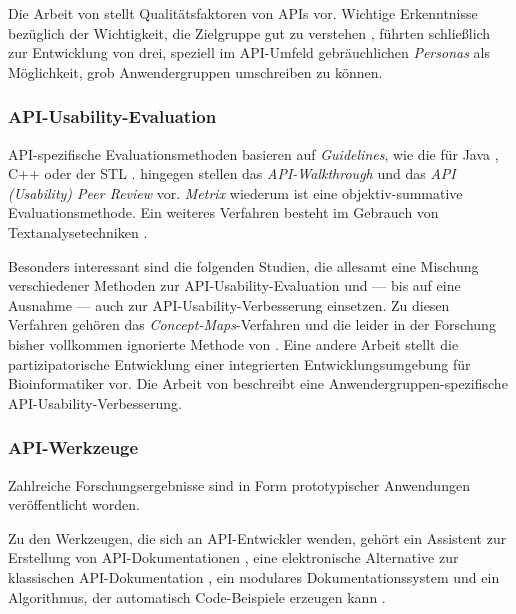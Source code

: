 Die Arbeit von \cite{Stylos:2007ip} stellt Qualitätsfaktoren von APIs vor. Wichtige Erkenntnisse bezüglich der Wichtigkeit, die Zielgruppe gut zu verstehen \citep{Nykaza:2002im}, führten schließlich zur Entwicklung von drei, speziell im API-Umfeld gebräuchlichen \textit{Personas} \citep{Stylos:2007jb,clarke:DSP:2007:1080} als Möglichkeit, grob Anwendergruppen umschreiben zu können.

\subsubsection{API-Usability-Evaluation}

API-spezifische Evaluationsmethoden basieren auf \textit{Guidelines}, wie die für Java \citep{bloch2008effective}, C++ \citep{meyers1998effective} oder der STL \citep{Meyers:2001uz}.
\cite{OCallaghan:2010iv} hingegen stellen das \textit{API-Walkthrough} und \cite{UmerFarooq:2010tt,SIGCHI:2009up,Farooq:2010iv} das \textit{API (Usability) Peer Review} vor. \textit{Metrix} \citep{deSouza:ek} wiederum ist eine objektiv-summative Evaluationsmethode. Ein weiteres Verfahren besteht im Gebrauch von Textanalysetechniken \citep{Watson:2009bm}.

Besonders interessant sind die folgenden Studien, die allesamt eine Mischung verschiedener Methoden zur API-Usability-Evaluation und --- bis auf eine Ausnahme \citep{Piccioni:2013uq} --- auch zur API-Usability-Verbesserung einsetzen. Zu diesen Verfahren gehören das \textit{Concept-Maps}-Verfahren \citep{Tenny:2011jp} und die leider in der Forschung bisher vollkommen ignorierte Methode von \cite{Grill:2012jm}. Eine andere Arbeit \citep{Letondal:2006dy} stellt die partizipatorische Entwicklung einer integrierten Entwicklungsumgebung für Bioinformatiker vor. Die Arbeit von \cite{Stylos:2008cu} beschreibt eine Anwendergruppen-spezifische API-Usability-Verbesserung.

\subsubsection{API-Werkzeuge}

Zahlreiche Forschungsergebnisse sind in Form prototypischer Anwendungen veröffentlicht worden.

Zu den Werkzeugen, die sich an API-Entwickler wenden, gehört ein Assistent zur Erstellung von API-Dokumentationen \citep{Dahotre:2011vr}, eine elektronische Alternative zur klassischen API-Dokumentation \citep{Berglund:2003bs}, ein modulares Dokumentationssystem \citep{Horie:2010dq} und ein Algorithmus, der automatisch Code-Beispiele erzeugen kann \citep{Buse:2012vv}.


